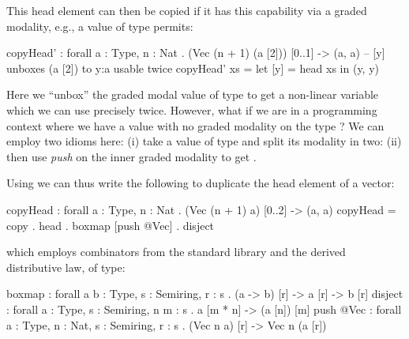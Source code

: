  This head element can then be copied
 if it has this capability via a graded modality, e.g., a value of type  permits:
\begin{granule}
copyHead' : forall {a : Type, n : Nat} 
           . (Vec (n + 1) (a [2])) [0..1] -> (a, a)
-- [y] unboxes (a [2]) to y:a usable twice
copyHead' xs = let [y] = head xs in (y, y) 
\end{granule}
 Here we ``unbox'' the graded modal value of type  to
 get a non-linear variable  which we can use precisely twice.
 However, what if we are in a programming
 context where we have a value  with no
 graded modality on the type ? %
 We can employ two idioms here:
 (i) take a value of type  and
 split its modality in two: 
 (ii) then use \textit{push} on the inner graded modality
 \granin{[2]} to get
 .
 
 Using  we can thus write the following to duplicate
 the head element of a vector:
\begin{granule}
copyHead : forall {a : Type, n : Nat} 
         . (Vec (n + 1) a) [0..2] -> (a, a)
copyHead = copy . head . boxmap [push @Vec] . disject
\end{granule}
 which employs combinators from the standard library and
 the derived distributive law, of type:
\begin{granule}
boxmap    : forall {a b : Type, s : Semiring, r : s} 
          . (a  -> b) [r] -> a [r] -> b [r]
disject   : forall {a : Type, s : Semiring, n m : s}   
          . a [m * n] -> (a [n]) [m]
push @Vec : forall {a : Type, n : Nat, s : Semiring, r : s} 
          . (Vec n a) [r] -> Vec n (a [r])
\end{granule}
